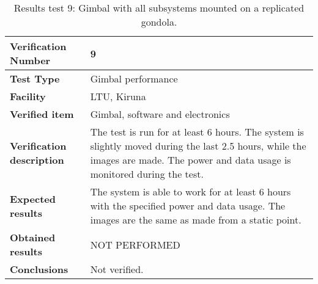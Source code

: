 \begin{table}[H]
\centering

\begin{tabular}{|m{}| m{} |}
\hline
\textbf{Verification Number} 		& 9 				\\ \hline
\textbf{Test Type} 					& Gimbal performance\\ \hline
\textbf{Facility} 					& LTU, Kiruna 		\\ \hline
\textbf{Verified item} 				& Gimbal, software and electronics \\ \hline

\textbf{Verification description} 	& The test is run for at least 6 hours. The system is slightly moved during the last 2.5 hours, while the images are made. The power and data usage is monitored during the test. \\ \hline

\textbf{Expected results} 			& The system is able to work for at least 6 hours with the specified power and data usage. The images are the same as made from a static point. \\ \hline

\textbf{Obtained results} 			&NOT PERFORMED \\ \hline

\textbf{Conclusions} 				& Not verified.		\\ \hline
\end{tabular}
\caption{Results test 9: Gimbal with all subsystems mounted on a replicated gondola.}
\label{tab:testresult9:gimbal}
\end{table}


\raggedbottom
